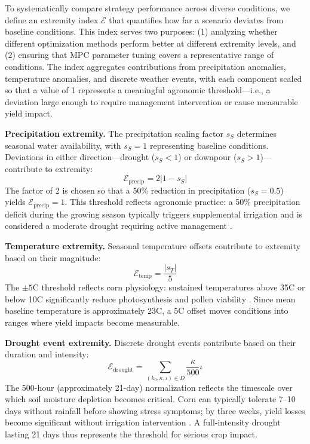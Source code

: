 \documentclass[pdflatex,sn-mathphys-num]{sn-jnl}
\newcommand{\df}[2]{\displaystyle\frac{#1}{#2}}
\begin{document}
To systematically compare strategy performance across diverse conditions, we define an extremity index $\mathcal{E}$ that quantifies how far a scenario deviates from baseline conditions. This index serves two purposes: (1) analyzing whether different optimization methods perform better at different extremity levels, and (2) ensuring that MPC parameter tuning covers a representative range of conditions. The index aggregates contributions from precipitation anomalies, temperature anomalies, and discrete weather events, with each component scaled so that a value of 1 represents a meaningful agronomic threshold---i.e., a deviation large enough to require management intervention or cause measurable yield impact.

\textbf{Precipitation extremity.} The precipitation scaling factor $s_S$ determines seasonal water availability, with $s_S = 1$ representing baseline conditions. Deviations in either direction---drought ($s_S < 1$) or downpour ($s_S > 1$)---contribute to extremity:
\begin{equation}
\mathcal{E}_{\text{precip}} = 2|1 - s_{S}|
\label{eqn:extreme-precip}
\end{equation}
The factor of 2 is chosen so that a 50\% reduction in precipitation ($s_S = 0.5$) yields $\mathcal{E}_{\text{precip}} = 1$. This threshold reflects agronomic practice: a 50\% precipitation deficit during the growing season typically triggers supplemental irrigation and is considered a moderate drought requiring active management \cite{kranz2008irrigation}.

\textbf{Temperature extremity.} Seasonal temperature offsets contribute to extremity based on their magnitude:
\begin{equation}
\mathcal{E}_{\text{temp}} = \df{|s_{T}|}{5}
\label{eqn:extreme-temp}
\end{equation}
The $\pm 5$\textdegree C threshold reflects corn physiology: sustained temperatures above 35\textdegree C or below 10\textdegree C significantly reduce photosynthesis and pollen viability \cite{hatfield2015temperature}. Since mean baseline temperature is approximately 23\textdegree C, a 5\textdegree C offset moves conditions into ranges where yield impacts become measurable.

\textbf{Drought event extremity.} Discrete drought events contribute based on their duration and intensity:
\begin{equation}
\mathcal{E}_{\text{drought}} = \sum_{(k_{0}, \kappa, \iota)\in D} \df{\kappa}{500}\iota
\label{eqn:extreme-drought}
\end{equation}
The 500-hour (approximately 21-day) normalization reflects the timescale over which soil moisture depletion becomes critical. Corn can typically tolerate 7--10 days without rainfall before showing stress symptoms; by three weeks, yield losses become significant without irrigation intervention \cite{kranz2008irrigation}. A full-intensity drought lasting 21 days thus represents the threshold for serious crop impact.
\end{document}
